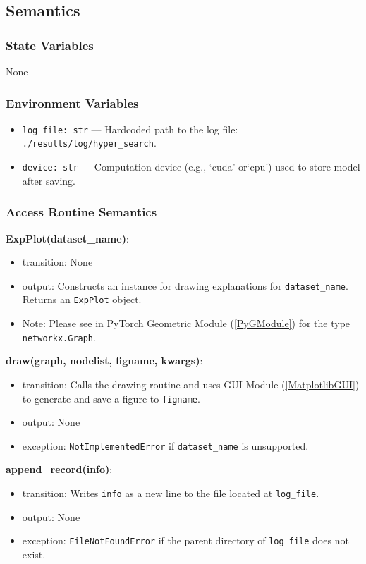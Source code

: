 \documentclass[12pt, titlepage]{article}
\begin{document}
\subsection{Semantics}

\subsubsection{State Variables}
None

\subsubsection{Environment Variables}
\begin{itemize}
  \item \texttt{log\_file: str} — Hardcoded path to the log file: \texttt{./results/log/hyper\_search}.
  \item \texttt{device: str} — Computation device (e.g., `cuda' or`cpu') used to store model after saving.
\end{itemize}

\subsubsection{Access Routine Semantics}

\noindent \textbf{ExpPlot(dataset\_name)}:
\begin{itemize}
  \item transition: None
  \item output: Constructs an instance for drawing explanations for \texttt{dataset\_name}. Returns an \texttt{ExpPlot} object.
  \item Note: Please see in PyTorch Geometric Module (\ref{PyGModule}) for the type \texttt{networkx.Graph}.
\end{itemize}

\noindent \textbf{draw(graph, nodelist, figname, kwargs)}:
\begin{itemize}
  \item transition: Calls the drawing routine and uses GUI Module (\ref{MatplotlibGUI}) to generate and save a figure to \texttt{figname}.
  \item output: None
  \item exception: \texttt{NotImplementedError} if \texttt{dataset\_name} is unsupported.
\end{itemize}

\noindent \textbf{append\_record(info)}:
\begin{itemize}
  \item transition: Writes \texttt{info} as a new line to the file located at \texttt{log\_file}.
  \item output: None
  \item exception: \texttt{FileNotFoundError} if the parent directory of \texttt{log\_file} does not exist.
\end{itemize}
\end{document}
